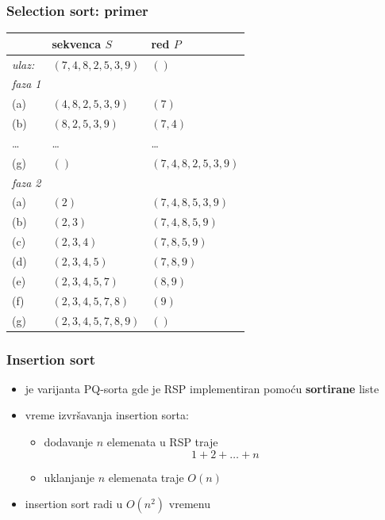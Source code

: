\documentclass[compress,aspectratio=169]{beamer}
\begin{document}
\begin{frame}
  \frametitle{Selection sort: primer}
  \begin{center}
    \begin{tabular}{lll}
       & \textbf{sekvenca $S$} & \textbf{red $P$} \\ \hline\hline
      \textit{ulaz:} & $(7,4,8,2,5,3,9)$ & $()$ \\ \hline
      \textit{faza 1} &  & \\ 
      (a) & $(4,8,2,5,3,9)$ & $(7)$ \\ 
      (b) & $(8,2,5,3,9)$ & $(7,4)$ \\ 
      \ldots & \ldots & \ldots \\
      (g) & $()$ & $(7,4,8,2,5,3,9)$ \\ \hline
      \textit{faza 2} &  & \\ 
      (a) & $(2)$ & $(7,4,8,5,3,9)$ \\ 
      (b) & $(2,3)$ & $(7,4,8,5,9)$ \\ 
      (c) & $(2,3,4)$ & $(7,8,5,9)$ \\ 
      (d) & $(2,3,4,5)$ & $(7,8,9)$ \\ 
      (e) & $(2,3,4,5,7)$ & $(8,9)$ \\ 
      (f) & $(2,3,4,5,7,8)$ & $(9)$ \\ 
      (g) & $(2,3,4,5,7,8,9)$ & $()$
    \end{tabular}
  \end{center}
\end{frame}

\begin{frame}[fragile]
  \frametitle{Insertion sort}
  \begin{itemize}
    \item {} je varijanta PQ-sorta gde je RSP implementiran pomoću \textbf{sortirane} liste
    \item vreme izvršavanja insertion sorta:
    \begin{itemize}
      \item dodavanje $n$ elemenata u RSP traje \\
      $$1 + 2 + \ldots + n$$ 
      \item uklanjanje $n$ elemenata traje $O(n)$
    \end{itemize}
    \item insertion sort radi u $O(n^2)$ vremenu
  \end{itemize}
\end{frame}
\end{document}
